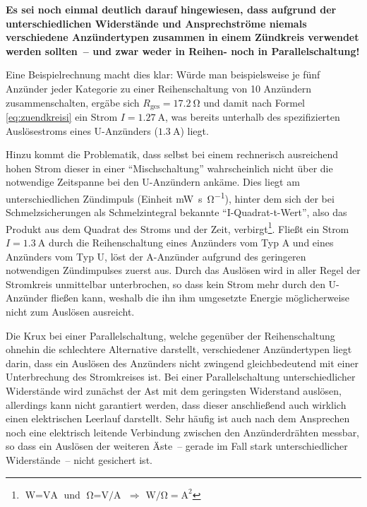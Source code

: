 \documentclass[paper=a4, parskip, numbers=noenddot, toc=listof, headsepline]{scrbook}
\begin{document}
				\textbf{Es sei noch einmal deutlich darauf hingewiesen, dass aufgrund der unterschiedlichen Widerstände und Ansprechströme niemals verschiedene Anzündertypen zusammen in einem Zündkreis verwendet werden sollten~-- und zwar weder in Reihen- noch in Parallelschaltung!}

				Eine Beispielrechnung macht dies klar: Würde man beispielsweise je fünf Anzünder jeder Kategorie zu einer Reihenschaltung von 10 Anzündern zusammenschalten, ergäbe sich $R_\text{ges} = \SI{17,2}{\ohm}$ und damit nach Formel \eqref{eq:zuendkreisi} ein Strom $I = \SI{1,27}{\ampere}$, was bereits unterhalb des spezifizierten Auslösestroms eines U-Anzünders ($\SI{1,3}{\ampere}$) liegt.

				Hinzu kommt die Problematik, dass selbst bei einem rechnerisch ausreichend hohen Strom dieser in einer \enquote{Mischschaltung} wahrscheinlich nicht über die notwendige Zeitspanne bei den U-Anzündern ankäme. Dies liegt am unterschiedlichen Zündimpuls (Einheit \si{\milli\watt\second\per\ohm}), hinter dem sich der bei Schmelzsicherungen als Schmelzintegral bekannte \enquote{I-Quadrat-t-Wert}, also das Produkt aus dem Quadrat des Stroms und der Zeit, verbirgt\footnote{$\si{\watt} = \si{\volt\ampere}$ und $\si{\ohm} = \si{\volt\per\ampere}$ $\Rightarrow$ $\si{\watt\per\ohm} = \si{\square\ampere}$}. Fließt ein Strom $I = \SI{1,3}{\ampere}$ durch die Reihenschaltung eines Anzünders vom Typ A und eines Anzünders vom Typ U, löst der A-Anzünder aufgrund des geringeren notwendigen Zündimpulses zuerst aus. Durch das Auslösen wird in aller Regel der Stromkreis unmittelbar unterbrochen, so dass kein Strom mehr durch den U-Anzünder fließen kann, weshalb die ihn ihm umgesetzte Energie möglicherweise nicht zum Auslösen ausreicht.

				Die Krux bei einer Parallelschaltung, welche gegenüber der Reihenschaltung ohnehin die schlechtere Alternative darstellt, verschiedener Anzündertypen liegt darin, dass ein Auslösen des Anzünders nicht zwingend gleichbedeutend mit einer Unterbrechung des Stromkreises ist. Bei einer Parallelschaltung unterschiedlicher Widerstände wird zunächst der Ast mit dem geringsten Widerstand auslösen, allerdings kann nicht garantiert werden, dass dieser anschließend auch wirklich einen elektrischen Leerlauf darstellt. Sehr häufig ist auch nach dem Ansprechen noch eine elektrisch leitende Verbindung zwischen den Anzünderdrähten messbar, so dass ein Auslösen der weiteren Äste~-- gerade im Fall stark unterschiedlicher Widerstände~-- nicht gesichert ist.
\end{document}
